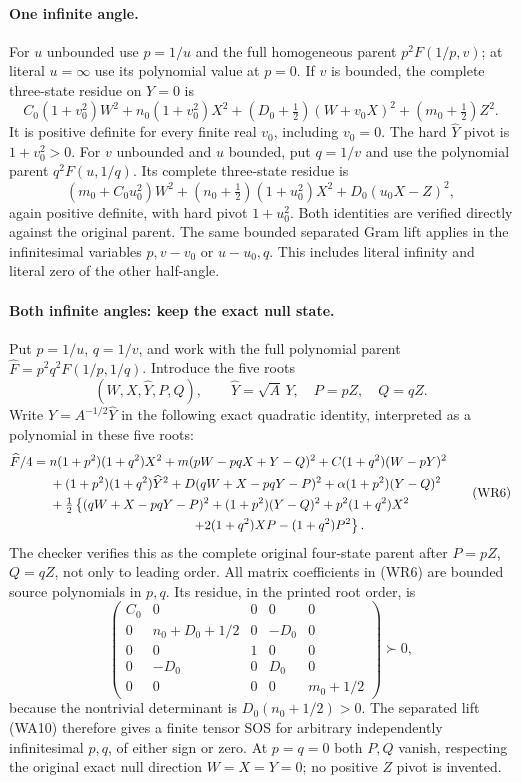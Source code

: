 \paragraph{One infinite angle.}
For $u$ unbounded use $p=1/u$ and the full homogeneous parent
$p^2F(1/p,v)$; at literal $u=\infty$ use its polynomial value
at $p=0$. If $v$ is bounded, the complete three-state residue on
$Y=0$ is
\[
 C_0(1+v_0^2)W^2+n_0(1+v_0^2)X^2
       +(D_0+\tfrac12)(W+v_0X)^2+(m_0+\tfrac12)Z^2.
                                                               \tag{WR4}
\]
It is positive definite for every finite real $v_0$, including
$v_0=0$. The hard $\widehat Y$ pivot is $1+v_0^2>0$.
For $v$ unbounded and $u$ bounded, put $q=1/v$ and use the
polynomial parent $q^2F(u,1/q)$. Its complete three-state residue is
\[
 (m_0+C_0u_0^2)W^2+(n_0+\tfrac12)(1+u_0^2)X^2
                                      +D_0(u_0X-Z)^2, \tag{WR5}
\]
again positive definite, with hard pivot $1+u_0^2$.
Both identities are verified directly against the original parent.
The same bounded separated Gram lift applies in the infinitesimal
variables $p,v-v_0$ or $u-u_0,q$. This includes literal infinity
and literal zero of the other half-angle.

\paragraph{Both infinite angles: keep the exact null state.}
Put $p=1/u$, $q=1/v$, and work with the full polynomial parent
$\widehat F=p^2q^2F(1/p,1/q)$. Introduce the five roots
\[
 (W,X,\widehat Y,P,Q),\qquad
 \widehat Y=\sqrt A\,Y,\quad P=pZ,\quad Q=qZ.
\]
Write $Y=A^{-1/2}\widehat Y$ in the following exact quadratic
identity, interpreted as a polynomial in these five roots:
\[
 \begin{split}
 \widehat F/4={}&n(1+p^2)(1+q^2)X^2
   +m(pW-pqX+Y-Q)^2+C(1+q^2)(W-pY)^2\\
 &+(1+p^2)(1+q^2)\widehat Y^2
   +D(qW+X-pqY-P)^2+\alpha(1+p^2)(Y-Q)^2\\
 &+\tfrac12\left\{(qW+X-pqY-P)^2+(1+p^2)(Y-Q)^2
       +p^2(1+q^2)X^2\right.\\
 &\hspace{39mm}\left.+2(1+q^2)XP-(1+q^2)P^2\right\}.
 \end{split}                                           \tag{WR6}
\]
The checker verifies this as the complete original four-state
parent after $P=pZ$, $Q=qZ$, not only to leading order.
All matrix coefficients in (WR6) are bounded source polynomials
in $p,q$. Its residue, in the printed root order, is
\[
 \begin{pmatrix}
 C_0&0&0&0&0\\
 0&n_0+D_0+1/2&0&-D_0&0\\
 0&0&1&0&0\\
 0&-D_0&0&D_0&0\\
 0&0&0&0&m_0+1/2
 \end{pmatrix}\succ0,                                 \tag{WR7}
\]
because the nontrivial determinant is $D_0(n_0+1/2)>0$.
The separated lift (WA10) therefore gives a finite tensor SOS
for arbitrary independently infinitesimal $p,q$, of either sign
or zero. At $p=q=0$ both $P,Q$ vanish, respecting the original
exact null direction $W=X=Y=0$; no positive $Z$ pivot is invented.


